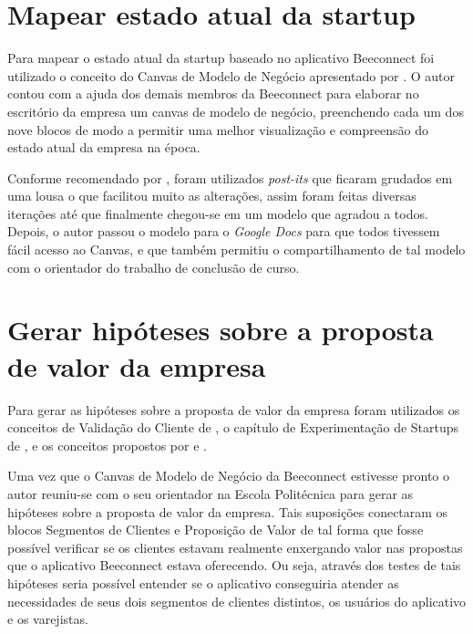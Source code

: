 \section{Mapear estado atual da startup}
\label{cha:mapear_estado}
Para mapear o estado atual da startup baseado no aplicativo Beeconnect foi utilizado o conceito do Canvas de Modelo de Negócio apresentado por .
O autor contou com a ajuda dos demais membros da Beeconnect para elaborar no escritório da empresa um canvas de modelo de negócio, preenchendo cada um dos nove blocos de modo a permitir uma melhor visualização e compreensão do estado atual da empresa na época. 

Conforme recomendado por  , foram utilizados \textit{post-its} que ficaram grudados em uma lousa o que facilitou muito as alterações, assim foram feitas diversas iterações até que finalmente chegou-se em um modelo que agradou a todos. Depois, o autor passou o modelo para o \textit{Google Docs} para que todos tivessem fácil acesso ao Canvas, e que também permitiu o compartilhamento de tal modelo com o orientador do trabalho de conclusão de curso.

\section{Gerar hipóteses sobre a proposta de valor da empresa}
\label{cha:gerar_hipoteses}
Para gerar as hipóteses sobre a proposta de valor da empresa foram utilizados os conceitos de Validação do Cliente de , o capítulo de Experimentação de Startups de , e os conceitos propostos por  e .    

Uma vez que o Canvas de Modelo de Negócio da Beeconnect estivesse pronto o autor reuniu-se com o seu orientador na Escola Politécnica para gerar as hipóteses sobre a proposta de valor da empresa. Tais suposições conectaram os blocos Segmentos de Clientes e Proposição de Valor de tal forma que fosse possível verificar se os clientes estavam realmente enxergando valor nas propostas que o aplicativo Beeconnect estava oferecendo. Ou seja, através dos testes de tais hipóteses seria possível entender se o aplicativo conseguiria atender as necessidades de seus dois segmentos de clientes distintos, os usuários do aplicativo e os varejistas.

